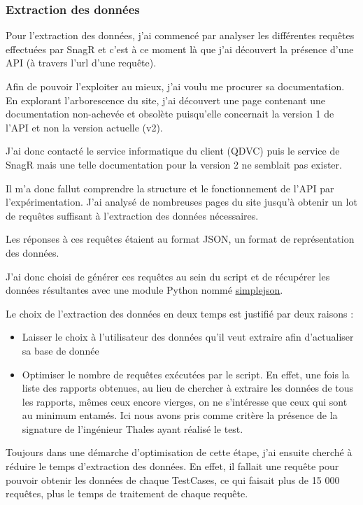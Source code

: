 \subsubsection{Extraction des données}

Pour l'extraction des données, j'ai commencé par analyser les différentes requêtes effectuées par \gls{SnagR} et c'est à ce moment là que j'ai découvert la présence d'une \gls{API} (à travers l'url d'une requête). 

Afin de pouvoir l'exploiter au mieux, j'ai voulu me procurer sa documentation. En explorant l'arborescence du site, j'ai découvert une page contenant une documentation non-achevée et obsolète puisqu'elle concernait la version 1 de l'\gls{API} et non la version actuelle (v2). 

J'ai donc contacté le service informatique du client (QDVC) puis le service de \gls{SnagR} mais une telle documentation pour la version 2 ne semblait pas exister. 

Il m'a donc fallut comprendre la structure et le fonctionnement de l'\gls{API} par l'expérimentation. 
J'ai analysé de nombreuses pages du site jusqu'à obtenir un lot de requêtes suffisant à l'extraction des données nécessaires.

Les réponses à ces requêtes étaient au format JSON, un format de représentation des données.

J'ai donc choisi de générer ces requêtes au sein du script et de récupérer les données résultantes avec une module Python nommé \underline{\href{https://simplejson.readthedocs.io/en/latest/}{simplejson}}.

Le choix de l'extraction des données en deux temps est justifié par deux raisons : 
\begin{itemize}
\item Laisser le choix à l'utilisateur des données qu'il veut extraire afin d'actualiser sa base de donnée
\item Optimiser le nombre de requêtes exécutées par le script. En effet, une fois la liste des rapports obtenues, au lieu de chercher à extraire les données de tous les rapports, mêmes ceux encore vierges, on ne s'intéresse que ceux qui sont au minimum entamés. Ici nous avons pris comme critère la présence de la signature de l'ingénieur Thales ayant réalisé le test. 
\end{itemize}

Toujours dans une démarche d'optimisation de cette étape, j'ai ensuite cherché à réduire le temps d'extraction des données. En effet, il fallait une requête pour pouvoir obtenir les données de chaque \gls{TestCases}, ce qui faisait plus de 15 000 requêtes, plus le temps de traitement de chaque requête. 

